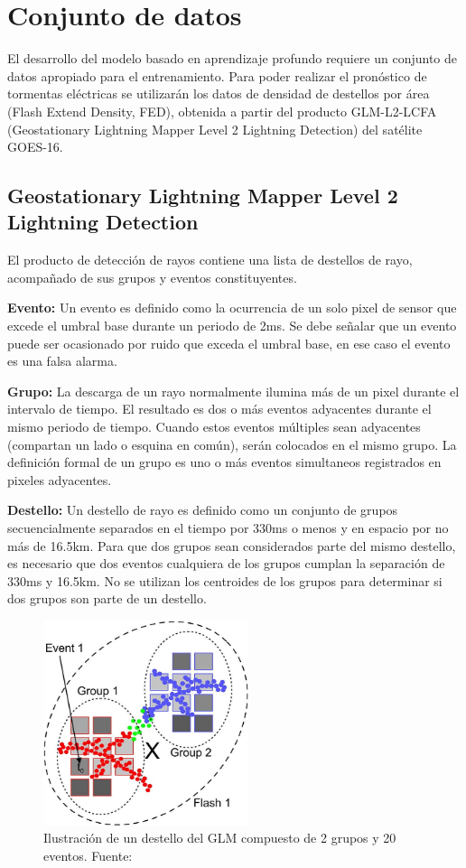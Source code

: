 \section{Conjunto de datos}

El desarrollo del modelo basado en aprendizaje profundo requiere un conjunto de 
datos apropiado para el entrenamiento. Para poder realizar el pronóstico de 
tormentas eléctricas se utilizarán los datos de densidad de destellos por área 
(Flash Extend Density, FED), obtenida a partir del producto GLM-L2-LCFA 
(Geostationary Lightning Mapper Level 2 Lightning Detection) del satélite 
GOES-16.

\subsection{Geostationary Lightning Mapper Level 2 Lightning Detection}
El producto de detección de rayos contiene una lista de destellos de rayo, 
acompañado de sus grupos y eventos constituyentes.

\textbf{Evento: }Un evento es definido como la ocurrencia de un solo pixel de sensor que excede 
el umbral base durante un periodo de 2ms. Se debe señalar que un evento puede 
ser ocasionado por ruido que exceda el umbral base, en ese caso el evento es 
una falsa alarma.

\textbf{Grupo: }La descarga de un rayo normalmente ilumina más de un pixel durante el intervalo 
de tiempo. El resultado es dos o más eventos adyacentes durante el mismo 
periodo de tiempo. Cuando estos eventos múltiples sean adyacentes (compartan 
un lado o esquina en común), serán colocados en el mismo grupo. La definición 
formal de un grupo es uno o más eventos simultaneos registrados en pixeles 
adyacentes.

\textbf{Destello: }Un destello de rayo es definido como un conjunto de grupos 
secuencialmente separados en el tiempo por 330ms o menos y en espacio por no 
más de 16.5km. Para que dos grupos sean considerados parte del mismo destello, 
es necesario que dos eventos cualquiera de los grupos cumplan la separación de 
330ms y 16.5km. No se utilizan los centroides de los grupos para determinar 
si dos grupos son parte de un destello.

\begin{figure}[H]
  \centering
  \includegraphics[width=6cm]{E_IMAGENES/5_Metodologia/flash_group_event}
  \caption[Destello del GLM]{
    Ilustración de un destello del GLM compuesto de 2 grupos y 20 eventos.
    \newline
    Fuente: \citep{GOODMAN201334}
  }
  \label{fig:fed}
\end{figure}

